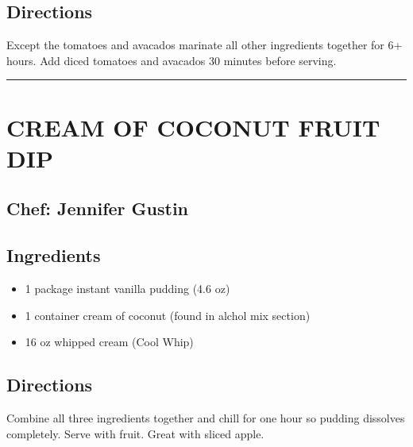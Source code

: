 \documentclass[
]{book}
\providecommand{\tightlist}{%
  \setlength{\itemsep}{0pt}\setlength{\parskip}{0pt}}
\begin{document}
\hypertarget{directions-1}{%
\subsection*{Directions}\label{directions-1}}

Except the tomatoes and avacados marinate all other ingredients together for 6+ hours. Add diced tomatoes and avacados 30 minutes before serving.

\begin{center}\rule{0.5\linewidth}{0.5pt}\end{center}

\hypertarget{cream-of-coconut-fruit-dip}{%
\section*{CREAM OF COCONUT FRUIT DIP}\label{cream-of-coconut-fruit-dip}}

\hypertarget{chef-jennifer-gustin}{%
\subsection*{Chef: Jennifer Gustin}\label{chef-jennifer-gustin}}

\hypertarget{ingredients-2}{%
\subsection*{Ingredients}\label{ingredients-2}}

\begin{itemize}
\tightlist
\item
  1 package instant vanilla pudding (4.6 oz)
\item
  1 container cream of coconut (found in alchol mix section)
\item
  16 oz whipped cream (Cool Whip)
\end{itemize}

\hypertarget{directions-2}{%
\subsection*{Directions}\label{directions-2}}

Combine all three ingredients together and chill for one hour so pudding dissolves completely.
Serve with fruit. Great with sliced apple.
\end{document}
